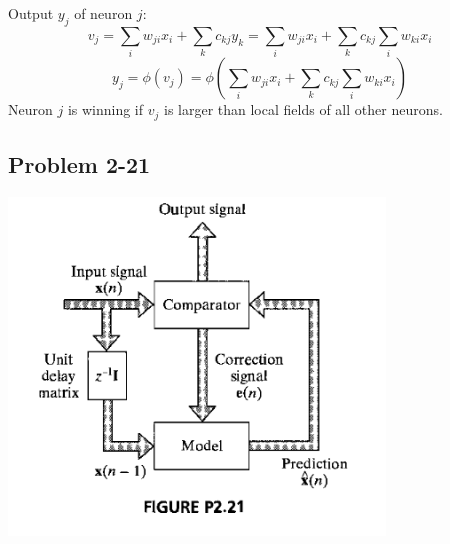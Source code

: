 \documentclass[paper=a4, fontsize=11pt]{scrartcl} %
\begin{document}
    Output $y_j$ of neuron $j$:
    \[ v_j = \sum_i w_{ji} x_i + \sum_k c_{kj} y_k = \sum_i w_{ji} x_i + \sum_k c_{kj} \sum_i w_{ki} x_i \]
    \[ y_j = \phi(v_j) = \phi \left( \sum_i w_{ji} x_i + \sum_k c_{kj} \sum_i w_{ki} x_i \right) \]
    Neuron $j$ is winning if $v_j$ is larger than local fields of all other neurons.

    \subsection*{Problem 2-21}

    \begin{center}
        \setlength{\fboxsep}{0.5pt} %
        \setlength{\fboxrule}{0.5pt} %
        \includegraphics[width=10.0cm]{../images/Haykin-NN-figurep2-21.png} %
    \end{center}
\end{document}
